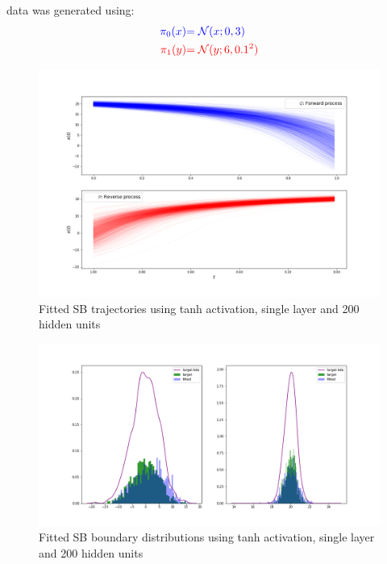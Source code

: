 \documentclass[a4paper,12pt,twoside,openright]{report}
\theoremstyle{definition}
\begin{document}
data was generated using:
\begin{align*}
\color{blue}{\pi_0(x)} &\color{blue}{= {\mathcal{N}}(x; 0,  3)} \\
    \color{red}{\pi_1(y)} &\color{red}{= {\mathcal{N}}(y; 6, 0.1^2)} 
\end{align*}
\begin{figure}
    \centering
    \includegraphics[scale=0.4,trim={4.3cm 1cm 2.5cm 0}, clip]{images/Control/big_var_marginals_best_tanh_trajectories.png}
    \caption{ Fitted SB  trajectories using tanh activation, single layer and 200 hidden units}
    \label{fig:trajectoriesbigvarnn}
\end{figure}
\begin{figure}
    \centering
    \includegraphics[scale=0.4,trim={4.3cm 1cm 2.5cm 0}, clip]{images/Control/big_variance_tanh_marginals.png}
    \caption{ Fitted SB  boundary distributions using tanh activation, single layer and 200 hidden units}
    \label{fig:boundsbigvarnn}
\end{figure}
\end{document}
